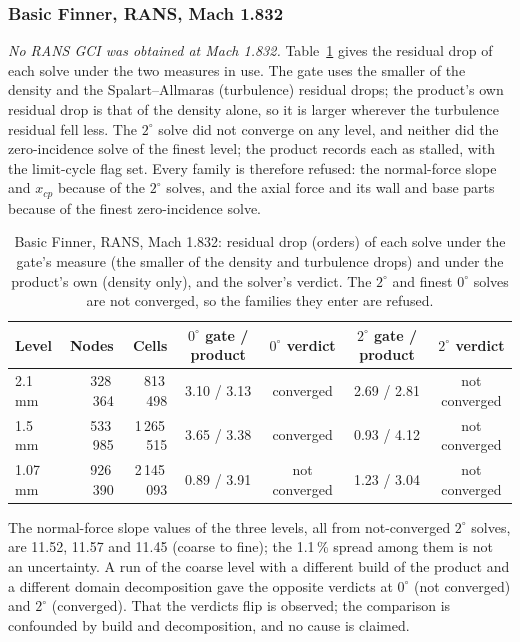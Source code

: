\documentclass[11pt,a4paper]{article}
\begin{document}
\subsubsection{Basic Finner, RANS, Mach 1.832}

\emph{No RANS GCI was obtained at Mach 1.832.}
Table~\ref{tab:rans} gives the residual drop of each solve under the two measures in use.
The gate uses the smaller of the density and the Spalart--Allmaras (turbulence) residual drops; the product's own residual drop is that of the density alone,
so it is larger wherever the turbulence residual fell less.
The $2^\circ$ solve did not converge on any level, and neither did the zero-incidence solve of the finest level; the product records each as stalled, with the limit-cycle flag set.
Every family is therefore refused: the normal-force slope and $x_{cp}$ because of the $2^\circ$ solves, and the axial force and its wall and base parts because of the finest zero-incidence solve.

\begin{table}[t]
\centering
\caption{Basic Finner, RANS, Mach 1.832: residual drop (orders) of each solve under the gate's measure (the smaller of the density and turbulence drops) and under the product's own (density only),
and the solver's verdict. The $2^\circ$ and finest $0^\circ$ solves are not converged, so the families they enter are refused.}
\label{tab:rans}
\small
\begin{tabular}{@{}lrrcccc@{}}
\toprule
Level & Nodes & Cells & $0^\circ$ gate / product & $0^\circ$ verdict & $2^\circ$ gate / product & $2^\circ$ verdict \\
\midrule
2.1\,mm & 328\,364 & 813\,498 & 3.10 / 3.13 & converged & 2.69 / 2.81 & not converged \\
1.5\,mm & 533\,985 & 1\,265\,515 & 3.65 / 3.38 & converged & 0.93 / 4.12 & not converged \\
1.07\,mm & 926\,390 & 2\,145\,093 & 0.89 / 3.91 & not converged & 1.23 / 3.04 & not converged \\
\bottomrule
\end{tabular}
\end{table}

The normal-force slope values of the three levels, all from not-converged $2^\circ$ solves, are 11.52, 11.57 and 11.45 (coarse to fine);
the 1.1\,\% spread among them is not an uncertainty.
A run of the coarse level with a different build of the product and a different domain decomposition gave the opposite verdicts at $0^\circ$ (not converged) and $2^\circ$ (converged).
That the verdicts flip is observed; the comparison is confounded by build and decomposition, and no cause is claimed.
\end{document}
